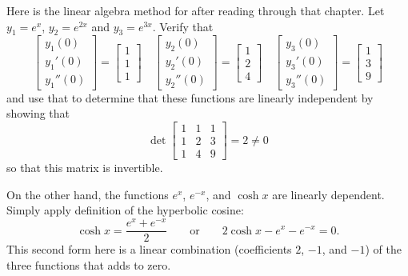 \begin{exercise}
Here is the linear algebra method for after reading through that chapter. Let $y_1 = e^x$, $y_2 = e^{2x}$ and $y_3 = e^{3x}$. Verify that
\begin{equation*}
\begin{bmatrix}
y_1(0) \\ y_1'(0) \\ y_1''(0) 
\end{bmatrix} = \begin{bmatrix} 1 \\ 1 \\ 1 \end{bmatrix} \quad 
\begin{bmatrix}
y_2(0) \\ y_2'(0) \\ y_2''(0) 
\end{bmatrix} = \begin{bmatrix} 1 \\ 2 \\ 4 \end{bmatrix} \quad
\begin{bmatrix}
y_3(0) \\ y_3'(0) \\ y_3''(0) 
\end{bmatrix} = \begin{bmatrix} 1 \\ 3 \\ 9 \end{bmatrix}
\end{equation*}
and use that to determine that these functions are linearly independent by showing that
\begin{equation*}
\det \begin{bmatrix} 1 & 1 & 1 \\ 1 & 2 & 3 \\ 1 & 4 & 9 \end{bmatrix} = 2 \neq 0
\end{equation*}
so that this matrix is invertible.
\end{exercise}

\begin{example}
On the other hand, the functions $e^x$, $e^{-x}$, and $\cosh x$ are linearly
dependent.  Simply apply definition of the hyperbolic cosine:
\begin{equation*}
\cosh x = \frac{e^x + e^{-x}}{2} 
\qquad
\text{or}
\qquad
2 \cosh x - e^x - e^{-x} = 0.
\end{equation*}
This second form here is a linear combination (coefficients $2$, $-1$, and $-1$) of the three functions that adds to zero.
\end{example}

